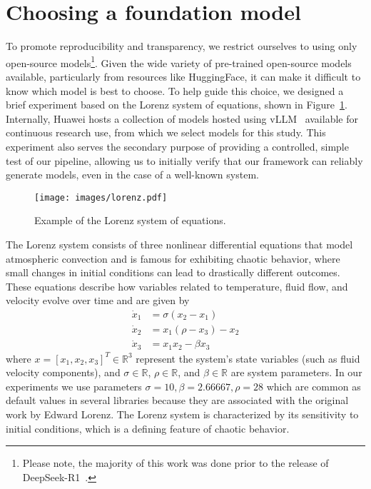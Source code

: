\documentclass{article}
\begin{document}
\clearpage              %
\onecolumn              %
\appendix               %

\section{Choosing a foundation model}\label{sec:choose-model}

To promote reproducibility and transparency, we restrict ourselves to using only open-source models\footnote{Please note, the majority of this work was done prior to the release of DeepSeek-R1~\cite{deepseekai2025deepseekr1incentivizingreasoningcapability}.}.
Given the wide variety of pre-trained open-source models available, 
particularly from resources like HuggingFace, 
it can make it difficult to know which model is best to choose. 
To help guide this choice, we designed a brief experiment based on the Lorenz system of equations, shown in Figure~\ref{fig:lorenz}. 
Internally, Huawei hosts a collection of models hosted using vLLM~\cite{kwon2023efficient} available for continuous research use, from which we select models for this study.
This experiment also serves the secondary purpose of providing a controlled, simple test of our pipeline, allowing us to initially verify that our framework can reliably generate models, even in the case of a well-known system.

\begin{figure}[H]
    \centering
    \texttt{[image: images/lorenz.pdf]}
    \caption{Example of the Lorenz system of equations.}
    \label{fig:lorenz}
\end{figure}

The Lorenz system consists of three nonlinear differential equations that model atmospheric convection and is famous for exhibiting chaotic behavior, where small changes in initial conditions can lead to drastically different outcomes.
These equations describe how variables related to temperature, fluid flow, and velocity evolve over time and are given by
\begin{equation}\label{eq:lorenz-system}
\begin{aligned}
\dot{x}_1 &= \sigma (x_2 - x_1) \\
\dot{x}_2 &= x_1 (\rho - x_3) - x_2 \\
\dot{x}_3 &= x_1x_2 - \beta x_3
\end{aligned}
\end{equation}
where $x = [x_1, x_2, x_3]^T\in\mathbb{R}^3$ represent the system's state variables (such as fluid velocity components), and $\sigma\in\mathbb{R}$, $\rho\in\mathbb{R}$, and $\beta\in\mathbb{R}$ are system parameters. 
In our experiments we use parameters $\sigma=10, \beta=2.66667, \rho=28$ which are common as default values in several libraries because they are associated with the original work by Edward Lorenz.
The Lorenz system is characterized by its sensitivity to initial conditions, which is a defining feature of chaotic behavior.
\end{document}
